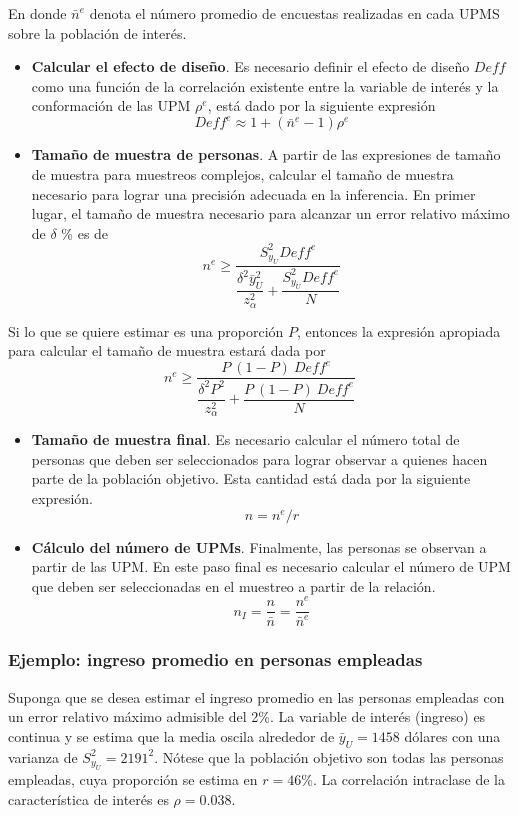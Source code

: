 \documentclass[
  10pt,
  spanish,
]{book}
\begin{document}
En donde \(\bar{n}^e\) denota el número promedio de encuestas realizadas en cada UPMS sobre la población de interés.

\begin{itemize}
\item
  \textbf{Calcular el efecto de diseño}. Es necesario definir el efecto de diseño \(Deff\) como una función de la correlación existente entre la variable de interés y la conformación de las UPM \(\rho^e\), está dado por la siguiente expresión
  \[
  Deff^e \approx 1 + (\bar{n}^e - 1)\rho^e
  \]
\item
  \textbf{Tamaño de muestra de personas}. A partir de las expresiones de tamaño de muestra para muestreos complejos, calcular el tamaño de muestra necesario para lograr una precisión adecuada en la inferencia. En primer lugar, el tamaño de muestra necesario para alcanzar un error relativo máximo de \(\delta\) \% es de
  \[
  n^e \geq \dfrac{S^2_{y_U}Deff^e}{\dfrac{\delta^2 \bar{y}_U^2}{z_{\alpha}^2}+\dfrac{S^2_{y_U}Deff^e}{N}}
  \]
\end{itemize}

Si lo que se quiere estimar es una proporción \(P\), entonces la expresión apropiada para calcular el tamaño de muestra estará dada por
\[
n^e \geq \dfrac{P\ (1-P)\ Deff^e}{\dfrac{\delta^2P^2}{z_{\alpha}^2 }+\dfrac{P\ (1-P) \ Deff^e}{N}}
\]

\begin{itemize}
\item
  \textbf{Tamaño de muestra final}. Es necesario calcular el número total de personas que deben ser seleccionados para lograr observar a quienes hacen parte de la población objetivo. Esta cantidad está dada por la siguiente expresión.
  \[
  n = n^e / r
  \]
\item
  \textbf{Cálculo del número de UPMs}. Finalmente, las personas se observan a partir de las UPM. En este paso final es necesario calcular el número de UPM que deben ser seleccionadas en el muestreo a partir de la relación.
  \[
  n_{I} = \frac{n}{\bar{n}} 
  = \frac{n^e}{\bar{n}^e}
  \]
\end{itemize}

\hypertarget{ejemplo-ingreso-promedio-en-personas-empleadas}{%
\subsubsection{Ejemplo: ingreso promedio en personas empleadas}\label{ejemplo-ingreso-promedio-en-personas-empleadas}}

Suponga que se desea estimar el ingreso promedio en las personas empleadas con un error relativo máximo admisible del 2\%. La variable de interés (ingreso) es continua y se estima que la media oscila alrededor de \(\bar{y}_U=1458\) dólares con una varianza de \(S^2_{y_U}=2191^2\). Nótese que la población objetivo son todas las personas empleadas, cuya proporción se estima en \(r = 46\)\%. La correlación intraclase de la característica de interés es \(\rho = 0.038\).
\end{document}

